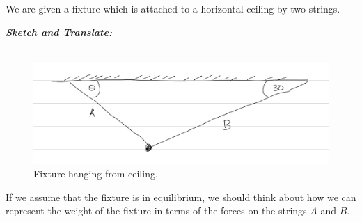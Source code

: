 %
%
%


\begin{subquestions}
	
	\subquestion
	We are given a fixture which is attached to a horizontal ceiling by two strings.
	
	\begin{subsubquestions}
		
		\subsubquestion
		
		\textbf{\textit{Sketch and Translate:}} \\ \\
		\begin{figure}[H]
			\begin{center}
				\includegraphics[scale=0.25]{../2016/figures/2016q5-1}
				\caption{\label{2016:q55:Sketch1} Fixture hanging from ceiling.}
			\end{center}
		\end{figure}
		If we assume that the fixture is in equilibrium, we should think about how we can represent the weight of the fixture in terms of the forces on the strings $A$ and $B$.
		
		
		

\end{subsubquestions}
\end{subquestions}
